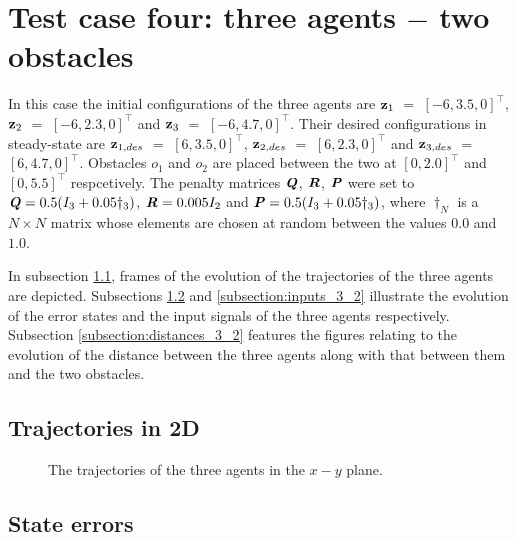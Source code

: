 \section{Test case four: three agents $-$ two obstacles}

In this case the initial configurations of the three agents are
$\bm{\mathbf{z}}_1$ $=$ $[-6, 3.5, 0]^{\top}$,
$\bm{\mathbf{z}}_2$ $=$ $[-6, 2.3, 0]^{\top}$ and
$\bm{\mathbf{z}}_3$ $=$ $[-6, 4.7, 0]^{\top}$.
Their desired configurations in steady-state are
$\bm{\mathbf{z}}_{1,des}$ $=$ $[6, 3.5, 0]^{\top}$,
$\bm{\mathbf{z}}_{2,des}$ $=$ $[6, 2.3, 0]^{\top}$ and
$\bm{\mathbf{z}}_{3,des}$ $=$ $[6, 4.7, 0]^{\top}$.
Obstacles $o_1$ and $o_2$ are placed between the two at $[0, 2.0]^{\top}$
and $[0, 5.5]^{\top}$ respcetively. The penalty
matrices $\bm{\mathit{Q}}$, $\bm{\mathit{R}}$, $\bm{\mathit{P}}$ were set to
$\bm{\mathit{Q}} = 0.5 (I_3 + 0.05\dagger_3)$, $\bm{\mathit{R}} = 0.005 I_2$ and
$\bm{\mathit{P}} = 0.5 (I_3 + 0.05\dagger_3)$, where $\dagger_N$ is a $N \times N$
matrix whose elements are chosen at random between the values $0.0$ and $1.0$.

In subsection \ref{subsection:trajectories_3_2}, frames of the evolution of the
trajectories of the three agents are depicted. Subsections
\ref{subsection:errors_3_2} and \ref{subsection:inputs_3_2} illustrate
the evolution of the error states and the input signals of the three agents
respectively. Subsection \ref{subsection:distances_3_2} features the
figures relating to the evolution of the distance between the three agents
along with that between them and the two obstacles.


\subsection{Trajectories in 2D}
\label{subsection:trajectories_3_2}

\begin{figure}[H]
  
  \caption{The trajectories of the three agents in the $x-y$ plane.}
  \label{fig:d_OFF_trajectory_3_2}
\end{figure}



\subsection{State errors}
\label{subsection:errors_3_2}

